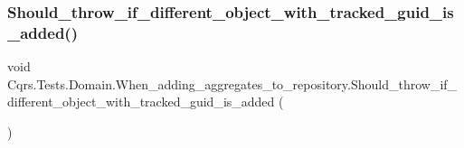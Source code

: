 \subsubsection{\texorpdfstring{Should\+\_\+throw\+\_\+if\+\_\+different\+\_\+object\+\_\+with\+\_\+tracked\+\_\+guid\+\_\+is\+\_\+added()}{Should\_throw\_if\_different\_object\_with\_tracked\_guid\_is\_added()}}
{\footnotesize\ttfamily void Cqrs.\+Tests.\+Domain.\+When\+\_\+adding\+\_\+aggregates\+\_\+to\+\_\+repository.\+Should\+\_\+throw\+\_\+if\+\_\+different\+\_\+object\+\_\+with\+\_\+tracked\+\_\+guid\+\_\+is\+\_\+added (\begin{DoxyParamCaption}{ }\end{DoxyParamCaption})}

